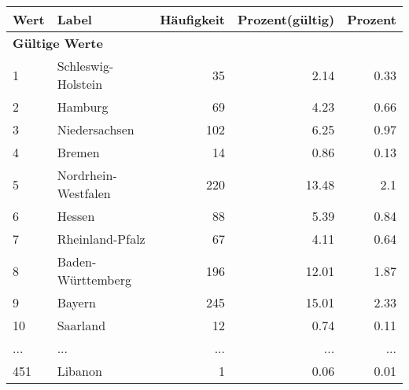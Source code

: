      \begin{longtable}{lXrrr}
     \toprule
     \textbf{Wert} & \textbf{Label} & \textbf{Häufigkeit} & \textbf{Prozent(gültig)} & \textbf{Prozent} \\
     \endhead
     \midrule
     \multicolumn{5}{l}{\textbf{Gültige Werte}}\\
        1 & \multicolumn{1}{X}{Schleswig-Holstein} & %
          \num{35} &
          \num[round-mode=places,round-precision=2]{2.14} &
          \num[round-mode=places,round-precision=2]{0.33} \\
        2 & \multicolumn{1}{X}{Hamburg} & %
          \num{69} &
          \num[round-mode=places,round-precision=2]{4.23} &
          \num[round-mode=places,round-precision=2]{0.66} \\
        3 & \multicolumn{1}{X}{Niedersachsen} & %
          \num{102} &
          \num[round-mode=places,round-precision=2]{6.25} &
          \num[round-mode=places,round-precision=2]{0.97} \\
        4 & \multicolumn{1}{X}{Bremen} & %
          \num{14} &
          \num[round-mode=places,round-precision=2]{0.86} &
          \num[round-mode=places,round-precision=2]{0.13} \\
        5 & \multicolumn{1}{X}{Nordrhein-Westfalen} & %
          \num{220} &
          \num[round-mode=places,round-precision=2]{13.48} &
          \num[round-mode=places,round-precision=2]{2.1} \\
        6 & \multicolumn{1}{X}{Hessen} & %
          \num{88} &
          \num[round-mode=places,round-precision=2]{5.39} &
          \num[round-mode=places,round-precision=2]{0.84} \\
        7 & \multicolumn{1}{X}{Rheinland-Pfalz} & %
          \num{67} &
          \num[round-mode=places,round-precision=2]{4.11} &
          \num[round-mode=places,round-precision=2]{0.64} \\
        8 & \multicolumn{1}{X}{Baden-Württemberg} & %
          \num{196} &
          \num[round-mode=places,round-precision=2]{12.01} &
          \num[round-mode=places,round-precision=2]{1.87} \\
        9 & \multicolumn{1}{X}{Bayern} & %
          \num{245} &
          \num[round-mode=places,round-precision=2]{15.01} &
          \num[round-mode=places,round-precision=2]{2.33} \\
        10 & \multicolumn{1}{X}{Saarland} & %
          \num{12} &
          \num[round-mode=places,round-precision=2]{0.74} &
          \num[round-mode=places,round-precision=2]{0.11} \\
       ... & ... & ... & ... & ... \\
        451 & \multicolumn{1}{X}{Libanon} & %
          \num{1} &
          \num[round-mode=places,round-precision=2]{0.06} &
          \num[round-mode=places,round-precision=2]{0.01} \\


\end{longtable}
